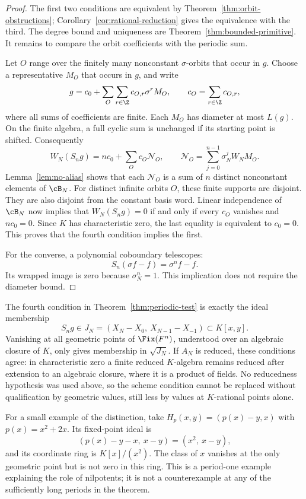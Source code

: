 \begin{proof}
The first two conditions are equivalent by
Theorem~\ref{thm:orbit-obstructions};
Corollary~\ref{cor:rational-reduction} gives the equivalence with the
third.  The degree bound and uniqueness are
Theorem~\ref{thm:bounded-primitive}.  It remains to compare the orbit
coefficients with the periodic sum.

Let $O$ range over the finitely many nonconstant $\sigma$-orbits that
occur in $g$.  Choose a representative $M_O$ that occurs in $g$, and write
\[
 g=c_0+\sum_O\sum_{r\in\Z}c_{O,r}\sigma^rM_O,
 \qquad c_O=\sum_{r\in\Z}c_{O,r},
\]
where all sums of coefficients are finite.  Each $M_O$ has diameter at
most $L(g)$.  On the finite algebra, a full cyclic sum is unchanged if
its starting point is shifted.  Consequently
\[
 W_N(S_ng)
 =nc_0+\sum_Oc_O\mathcal N_O,
 \qquad
 \mathcal N_O=\sum_{j=0}^{n-1}\sigma_N^jW_NM_O.
\]
Lemma~\ref{lem:no-alias} shows that each $\mathcal N_O$ is a sum of
$n$ distinct nonconstant elements of $\cB_N$.  For distinct infinite
orbits $O$, these finite supports are disjoint.  They are also disjoint
from the constant basis word.  Linear independence of $\cB_N$ now
implies that $W_N(S_ng)=0$ if and only if every $c_O$ vanishes and
$nc_0=0$.  Since $K$ has characteristic zero, the last equality is
equivalent to $c_0=0$.  This proves that the fourth condition implies
the first.

For the converse, a polynomial coboundary telescopes:
\[
 S_n(\sigma f-f)=\sigma^nf-f.
\]
Its wrapped image is zero because $\sigma_N^n=1$.
This implication does not require the diameter bound.
\end{proof}

\begin{remark}\label{rem:scheme-values}
The fourth condition in Theorem~\ref{thm:periodic-test} is exactly the
ideal membership
\[
 S_ng\in J_N=(X_N-X_0,\ X_{N-1}-X_{-1})\subset K[x,y].
\]
Vanishing at all geometric points of $\Fix(F^n)$, understood over an
algebraic closure of $K$, only gives membership in $\sqrt{J_N}$.
If $A_N$ is reduced, these conditions agree: in characteristic zero a
finite reduced $K$-algebra remains reduced after extension to an
algebraic closure, where it is a product of fields.  No reducedness
hypothesis was used above, so the scheme condition cannot be replaced
without qualification by geometric values, still less by values at
$K$-rational points alone.

For a small example of the distinction, take
$H_p(x,y)=(p(x)-y,x)$ with $p(x)=x^2+2x$.  Its fixed-point ideal is
\[
 (p(x)-y-x,\ x-y)=(x^2,\ x-y),
\]
and its coordinate ring is $K[x]/(x^2)$.  The class of $x$ vanishes at
the only geometric point but is not zero in this ring.  This is a
period-one example explaining the role of nilpotents; it is not a
counterexample at any of the sufficiently long periods in the theorem.
\end{remark}
